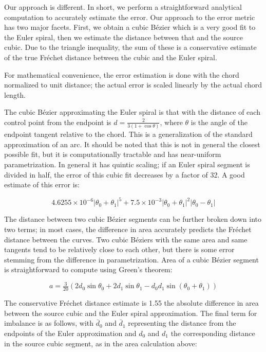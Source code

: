\documentclass[sigconf, authordraft]{acmart}
\begin{document}
Our approach is different. In short, we perform a straightforward analytical computation to accurately estimate the error. Our approach to the error metric has two major facets. First, we obtain a cubic Bézier which is a very good fit to the Euler spiral, then we estimate the distance between that and the source cubic. Due to the triangle inequality, the sum of these is a conservative estimate of the true Fréchet distance between the cubic and the Euler spiral.

For mathematical convenience, the error estimation is done with the chord normalized to unit distance; the actual error is scaled linearly by the actual chord length.

The cubic Bézier approximating the Euler spiral is that with the distance of each control point from the endpoint is $d = \frac{2}{3(1 + \cos \theta)}$, where $\theta$ is the angle of the endpoint tangent relative to the chord. This is a generalization of the standard approximation of an arc. It should be noted that this is not in general the closest possible fit, but it is computationally tractable and has near-uniform parametrization. In general it has quintic scaling; if an Euler spiral segment is divided in half, the error of this cubic fit decreases by a factor of 32. A good estimate of this error is:

\[
    4.6255\times10^{-6}|\theta_0+\theta_1|^5 + 7.5\times10^{-3}|\theta_0+\theta_1|^2|\theta_0-\theta_1|
\]



The distance between two cubic Bézier segments can be further broken down into two terms; in most cases, the difference in area accurately predicts the Fréchet distance between the curves. Two cubic Béziers with the same area and same tangents tend to be relatively close to each other, but there is some error stemming from the difference in parametrization. Area of a cubic Bézier segment is straightforward to compute using Green's theorem:

\[
    a = \tfrac{3}{20}(2d_0\sin \theta_0 + 2d_1\sin \theta_1 - d_0 d_1\sin(\theta_0+\theta_1))
\]

The conservative Fréchet distance estimate is 1.55 the absolute difference in area between the source cubic and the Euler spiral approximation. The final term for imbalance is as follows, with $\bar{d}_0$ and $\bar{d}_1$ representing the distance from the endpoints of the Euler approximation and $d_0$ and $d_1$ the corresponding distance in the source cubic segment, as in the area calculation above:
\end{document}

